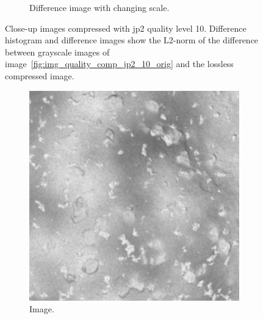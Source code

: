 \begin{figure}[htb]
\begin{subfigure}[b]{0.48\textwidth}
        \caption{Difference image with changing scale.}
        \label{fig:img_quality_comp_jp2_10_center_diff_rel}
    \end{subfigure}
    \caption{Close-up images compressed with \gls{jp2} quality level 10. Difference histogram and difference images show the L2-norm of the difference between grayscale images of image~\ref{fig:img_quality_comp_jp2_10_orig} and the lossless compressed image.}
    \label{fig:img_quality_comp_jp2_10_center}
\end{figure}

\begin{figure}[htb]
    \centering
    \begin{subfigure}[b]{0.48\textwidth}
        \centering
        \includegraphics[width=\textwidth]{doc/thesis/0_figures/compare_quality/set1/jp2_100_center.png}
        \caption{Image.}
        \label{fig:img_quality_comp_jp2_100_center_orig}
    \end{subfigure}
    \begin{subfigure}[b]{0.48\textwidth}
        \centering

\end{subfigure}
\end{figure}
